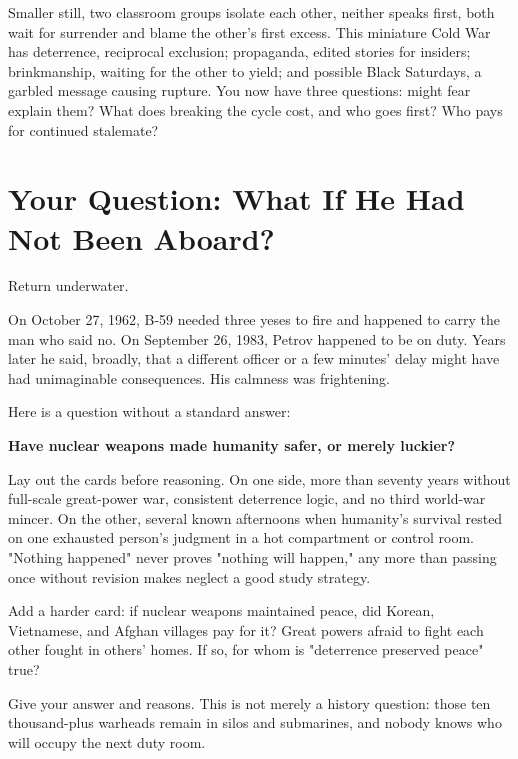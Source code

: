 Smaller still, two classroom groups isolate each other, neither speaks first, both wait for surrender and blame the other's first excess. This miniature Cold War has deterrence, reciprocal exclusion; propaganda, edited stories for insiders; brinkmanship, waiting for the other to yield; and possible Black Saturdays, a garbled message causing rupture. You now have three questions: might fear explain them? What does breaking the cycle cost, and who goes first? Who pays for continued stalemate?

\section[What If He Had Not Been Aboard?]{Your Question: What If He Had Not Been Aboard?}
Return underwater.

On October 27, 1962, B-59 needed three yeses to fire and happened to carry the man who said no. On September 26, 1983, Petrov happened to be on duty. Years later he said, broadly, that a different officer or a few minutes' delay might have had unimaginable consequences. His calmness was frightening.

Here is a question without a standard answer:

\textbf{Have nuclear weapons made humanity safer, or merely luckier?}

Lay out the cards before reasoning. On one side, more than seventy years without full-scale great-power war, consistent deterrence logic, and no third world-war mincer. On the other, several known afternoons when humanity's survival rested on one exhausted person's judgment in a hot compartment or control room. "Nothing happened" never proves "nothing will happen," any more than passing once without revision makes neglect a good study strategy.

Add a harder card: if nuclear weapons maintained peace, did Korean, Vietnamese, and Afghan villages pay for it? Great powers afraid to fight each other fought in others' homes. If so, for whom is "deterrence preserved peace" true?

Give your answer and reasons. This is not merely a history question: those ten thousand-plus warheads remain in silos and submarines, and nobody knows who will occupy the next duty room.
